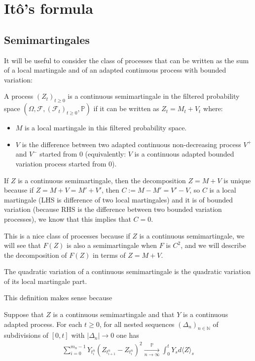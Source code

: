 \documentclass[../mainfile.tex]{subfiles}
\begin{document}
\section{Itô's formula}
\subsection{Semimartingales}
It will be useful to consider the class of processes that can be written as the sum of a local martingale and of an adapted continuous process with bounded variation:
\begin{defn} A process $(Z_t)_{t \geq 0}$ is a continuous semimartingale in the filtered probability space $( \Omega, \mathcal{F}, ( \mathcal{F}_t)_{t \geq 0}, \mathbb{P})$ if it can be written as $Z_t=M_t+V_t$ where: \begin{itemize}
\item $M$ is a local martingale in this filtered probability space.
\item $V$ is the difference between two adapted continuous non-decreasing process $V^+$ and $V^{-}$ started from $0$ (equivalently: $V$ is a continuous adapted bounded variation process started from $0$). 
\end{itemize}
\end{defn}
\begin{rem} If $Z$ is a continuous semimartingale, then the decomposition $Z=M+V$ is unique because if $Z=M+V=M'+V'$, then $C:=M-M'=V'-V$, so $C$ is a local martingale (LHS is difference of two local martingales) and it is of bounded variation (because RHS is the difference between two bounded variation processes), we know that this implies that $C=0$.  
\end{rem}
This is a nice class of processes because if $Z$ is a continuous semimartingale, we will see that $F(Z)$ is also a semimartingale when $F$ is $C^2$, and we will describe the decomposition of $F(Z)$ in terms of $Z=M+V$. 
\begin{defn} The quadratic variation of a continuous semimartingale is the quadratic variation of its local martingale part.
\end{defn}
This definition makes sense because
\begin{lem}\label{lem1} Suppose that $Z$ is a continuous semimartingale and that $Y$ is a continuous adapted process. For each $t \geq 0$, for all nested sequences $(\Delta_n)_{n \in \mathbb{N}}$ of subdivisions of $[0,t]$ with $|\Delta_n| \to 0$ one has 
\begin{align*}
\sum_{i=0}^{m_n-1} Y_{t_i^n}(Z_{t_{i+1}^n}-Z_{t_i^n})^2 \xrightarrow[n \to \infty]{\mathbb{P}} \int_0^t Y_s d  \langle Z \rangle_s 
\end{align*}
\end{lem}
\end{document}
